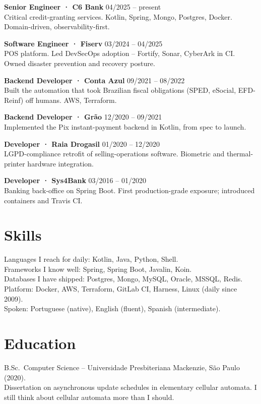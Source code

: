 \documentclass[10pt,a4paper]{article}
\begin{document}
\noindent\textbf{Senior Engineer · C6 Bank} \hfill 04/2025 -- present\\
Critical credit-granting services. Kotlin, Spring, Mongo, Postgres, Docker. Domain-driven, observability-first.

\medskip
\noindent\textbf{Software Engineer · Fiserv} \hfill 03/2024 -- 04/2025\\
POS platform. Led DevSecOps adoption -- Fortify, Sonar, CyberArk in CI. Owned disaster prevention and recovery posture.

\medskip
\noindent\textbf{Backend Developer · Conta Azul} \hfill 09/2021 -- 08/2022\\
Built the automation that took Brazilian fiscal obligations (SPED, eSocial, EFD-Reinf) off humans. AWS, Terraform.

\medskip
\noindent\textbf{Backend Developer · Grão} \hfill 12/2020 -- 09/2021\\
Implemented the Pix instant-payment backend in Kotlin, from spec to launch.

\medskip
\noindent\textbf{Developer · Raia Drogasil} \hfill 01/2020 -- 12/2020\\
LGPD-compliance retrofit of selling-operations software. Biometric and thermal-printer hardware integration.

\medskip
\noindent\textbf{Developer · Sys4Bank} \hfill 03/2016 -- 01/2020\\
Banking back-office on Spring Boot. First production-grade exposure; introduced containers and Travis CI.

\section{Skills}

\noindent
Languages I reach for daily: Kotlin, Java, Python, Shell.\\
Frameworks I know well: Spring, Spring Boot, Javalin, Koin.\\
Databases I have shipped: Postgres, Mongo, MySQL, Oracle, MSSQL, Redis.\\
Platform: Docker, AWS, Terraform, GitLab CI, Harness, Linux (daily since 2009).\\
Spoken: Portuguese (native), English (fluent), Spanish (intermediate).

\section{Education}

B.Sc.\ Computer Science -- Universidade Presbiteriana Mackenzie, São Paulo (2020).\\
Dissertation on asynchronous update schedules in elementary cellular automata. I still think about cellular automata more than I should.
\end{document}
